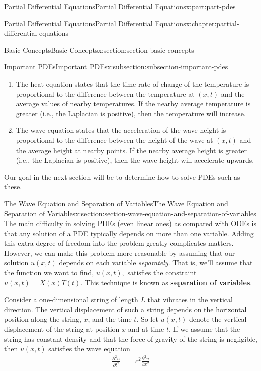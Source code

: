 \documentclass[twoside,10pt,]{book}
\newcommand{\terminology}[1]{\textbf{#1}}
\numberwithin{equation}{part}
\newcommand{\amp}{&}
\begin{document}
\begin{partptx}{Partial Differential Equations}{}{Partial Differential Equations}{}{}{x:part:part-pdes}
\begin{chapterptx}{Partial Differential Equations}{}{Partial Differential Equations}{}{}{x:chapter:partial-differential-equations}
\begin{sectionptx}{Basic Concepts}{}{Basic Concepts}{}{}{x:section:section-basic-concepts}
\begin{subsectionptx}{Important PDEs}{}{Important PDEs}{}{}{x:subsection:subsection-important-pdes}
\begin{enumerate}
\item{}The heat equation states that the time rate of change of the temperature is proportional to the difference between the temperature at \((x,t)\) and the average values of nearby temperatures. If the nearby average temperature is greater (i.e., the Laplacian is positive), then the temperature will increase.%
\item{}The wave equation states that the acceleration of the wave height is proportional to the difference between the height of the wave at \((x,t)\) and the average height at nearby points. If the nearby average height is greater (i.e., the Laplacian is positive), then the wave height will accelerate upwards.%
\end{enumerate}
%
\par
Our goal in the next section will be to determine how to solve PDEs such as these.%
\end{subsectionptx}
\end{sectionptx}
%
%
\typeout{************************************************}
\typeout{************************************************}
%
\begin{sectionptx}{The Wave Equation and Separation of Variables}{}{The Wave Equation and Separation of Variables}{}{}{x:section:section-wave-equation-and-separation-of-variables}
The main difficulty in solving PDEs (even linear ones) as compared with ODEs is that any solution of a PDE typically depends on more than one variable. Adding this extra degree of freedom into the problem greatly complicates matters. However, we can make this problem more reasonable by assuming that our solution \(u(x,t)\) depends on each variable \emph{separately}. That is, we'll assume that the function we want to find, \(u(x,t),\) satisfies the constraint \(u(x,t) = X(x)T(t)\). This technique is known as \terminology{separation of variables}.%
\par
Consider a one-dimensional string of length \(L\) that vibrates in the vertical direction. The vertical displacement of such a string depends on the horizontal position along the string, \(x\), and the time \(t\). So let \(u(x,t)\) denote the vertical displacement of the string at position \(x\) and at time \(t\). If we assume that the string has constant density and that the force of gravity of the string is negligible, then \(u(x,t)\) satisfies the wave equation%
\begin{align}
\frac{\partial^{2}u}{\partial t^{2}} \amp = c^{2}\frac{\partial^{2}u}{\partial x^{2}} \label{x:mrow:equation-wave-equation}

\end{align}
\end{sectionptx}
\end{chapterptx}
\end{partptx}
\end{document}
